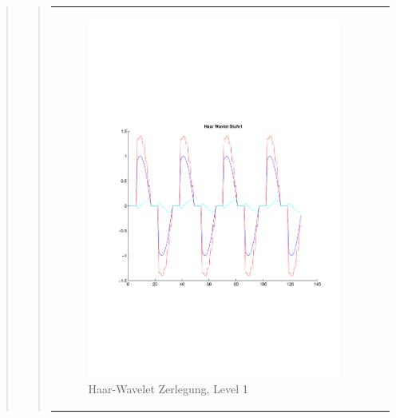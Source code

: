 \begin{quote}
\begin{quote}
\begin{center}
\begin{tabular}{ll}
\begin{minipage}{0.6\textwidth}
                        \begin{figure}[H]
                            \label{fig:}
                            \includegraphics[scale=0.45, trim = 0.8cm 6cm 3cm
                            7.5cm,
                            clip]{./Bilder/Termin8/Haar_Wavlet_lvl_1}
                            \caption{Haar-Wavelet Zerlegung, Level 1}
                        \end{figure}
    
                    \end{minipage}
                    \begin{minipage}{0.6\textwidth}
    

\end{minipage}
\end{tabular}
\end{center}
\end{quote}
\end{quote}
